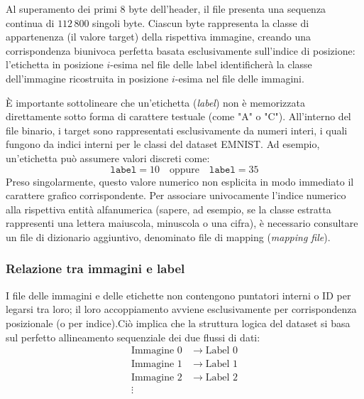 \documentclass[12pt,a4paper]{article}
\begin{document}
	Al superamento dei primi 8 byte dell'header, il file presenta una sequenza continua di $112\,800$ singoli byte. Ciascun byte rappresenta la classe di appartenenza (il valore target) della rispettiva immagine, creando una corrispondenza biunivoca perfetta basata esclusivamente sull'indice di posizione: l'etichetta in posizione $i$-esima nel file delle label identificherà la classe dell'immagine ricostruita in posizione $i$-esima nel file delle immagini. \newline

	È importante sottolineare che un'etichetta (\textit{label}) non è memorizzata direttamente sotto forma di carattere testuale (come "A" o "C"). All'interno del file binario, i target sono rappresentati esclusivamente da numeri interi, i quali fungono da indici interni per le classi del dataset EMNIST. Ad esempio, un'etichetta può assumere valori discreti come:
	$$\texttt{label} = 10 \quad \text{oppure} \quad \texttt{label} = 35$$
	Preso singolarmente, questo valore numerico non esplicita in modo immediato il carattere grafico corrispondente. Per associare univocamente l'indice numerico alla rispettiva entità alfanumerica (sapere, ad esempio, se la classe estratta rappresenti una lettera maiuscola, minuscola o una cifra), è necessario consultare un file di dizionario aggiuntivo, denominato file di mapping (\textit{mapping file}).

	\subsubsection{Relazione tra immagini e label}
	I file delle immagini e delle etichette non contengono puntatori interni o ID per legarsi tra loro; il loro accoppiamento avviene esclusivamente per corrispondenza posizionale (o per indice).Ciò implica che la struttura logica del dataset si basa sul perfetto allineamento sequenziale dei due flussi di dati:
	\begin{align*}
		\text{Immagine } 0 &\longrightarrow \text{Label } 0 \\
		\text{Immagine } 1 &\longrightarrow \text{Label } 1 \\
		\text{Immagine } 2 &\longrightarrow \text{Label } 2 \\
		\vdots
	\end{align*}
\end{document}

